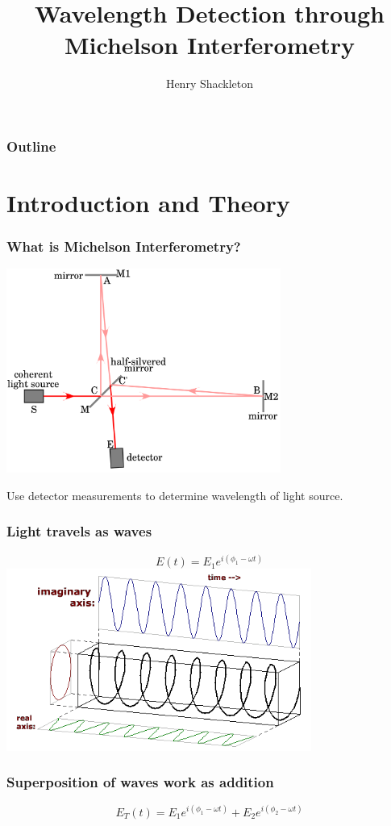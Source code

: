 \documentclass{beamer}
\title[Michelson Interferometry]{Wavelength Detection through Michelson Interferometry}
\author{Henry Shackleton}
\begin{document}
\titlepage

\begin{frame}
  \frametitle{Outline}
\tableofcontents
\end{frame}

\section{Introduction and Theory}


\begin{frame}
  \frametitle{What is Michelson Interferometry?}
  \includegraphics[width=9cm]{basic_interferometer.png}
  \pause

  Use detector measurements to determine wavelength of light source.
\end{frame}

\begin{frame}
  \frametitle{Light travels as waves}
  \begin{equation*}
    E(t) = E_1 e^{i\left(\phi_1 - \omega t\right)}
  \end{equation*}
  \hspace{5pt}\includegraphics[width=10cm]{complex.png}
\end{frame}

\begin{frame}
  \frametitle{Superposition of waves work as addition}
  \begin{center}
  \begin{equation*}
    E_T(t) = E_1 e^{i(\phi_1 - \omega t)} + E_2 e^{i(\phi_2 - \omega t)}
  \end{equation*}
\end{center}
\end{frame}
\end{document}
